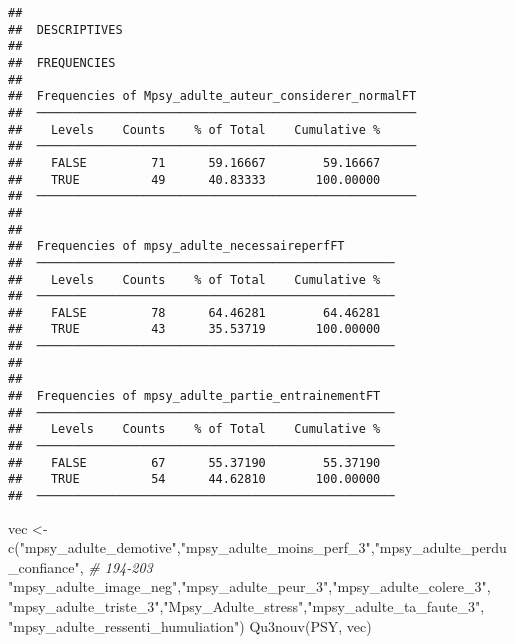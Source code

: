 \documentclass[
]{article}
\newenvironment{Shaded}{\begin{snugshade}}{\end{snugshade}}
\newcommand{\CommentTok}[1]{\textcolor[rgb]{0.56,0.35,0.01}{\textit{#1}}}
\newcommand{\FunctionTok}[1]{\textcolor[rgb]{0.00,0.00,0.00}{#1}}
\newcommand{\NormalTok}[1]{#1}
\newcommand{\OtherTok}[1]{\textcolor[rgb]{0.56,0.35,0.01}{#1}}
\newcommand{\StringTok}[1]{\textcolor[rgb]{0.31,0.60,0.02}{#1}}
\begin{document}
\begin{verbatim}
## 
##  DESCRIPTIVES
## 
##  FREQUENCIES
## 
##  Frequencies of Mpsy_adulte_auteur_considerer_normalFT 
##  ───────────────────────────────────────────────────── 
##    Levels    Counts    % of Total    Cumulative %   
##  ───────────────────────────────────────────────────── 
##    FALSE         71      59.16667        59.16667   
##    TRUE          49      40.83333       100.00000   
##  ───────────────────────────────────────────────────── 
## 
## 
##  Frequencies of mpsy_adulte_necessaireperfFT        
##  ────────────────────────────────────────────────── 
##    Levels    Counts    % of Total    Cumulative %   
##  ────────────────────────────────────────────────── 
##    FALSE         78      64.46281        64.46281   
##    TRUE          43      35.53719       100.00000   
##  ────────────────────────────────────────────────── 
## 
## 
##  Frequencies of mpsy_adulte_partie_entrainementFT   
##  ────────────────────────────────────────────────── 
##    Levels    Counts    % of Total    Cumulative %   
##  ────────────────────────────────────────────────── 
##    FALSE         67      55.37190        55.37190   
##    TRUE          54      44.62810       100.00000   
##  ──────────────────────────────────────────────────
\end{verbatim}

\begin{Shaded}
\begin{Highlighting}[]
\NormalTok{vec }\OtherTok{\textless{}{-}} \FunctionTok{c}\NormalTok{(}\StringTok{"mpsy\_adulte\_demotive"}\NormalTok{,}\StringTok{"mpsy\_adulte\_moins\_perf\_3"}\NormalTok{,}\StringTok{"mpsy\_adulte\_perdu\_confiance"}\NormalTok{,  }\CommentTok{\# 194{-}203}
    \StringTok{"mpsy\_adulte\_image\_neg"}\NormalTok{,}\StringTok{"mpsy\_adulte\_peur\_3"}\NormalTok{,}\StringTok{"mpsy\_adulte\_colere\_3"}\NormalTok{,}
    \StringTok{"mpsy\_adulte\_triste\_3"}\NormalTok{,}\StringTok{"Mpsy\_Adulte\_stress"}\NormalTok{,}\StringTok{"mpsy\_adulte\_ta\_faute\_3"}\NormalTok{,}
    \StringTok{"mpsy\_adulte\_ressenti\_humuliation"}\NormalTok{)}
\FunctionTok{Qu3nouv}\NormalTok{(PSY, vec)}
\end{Highlighting}
\end{Shaded}
\end{document}
